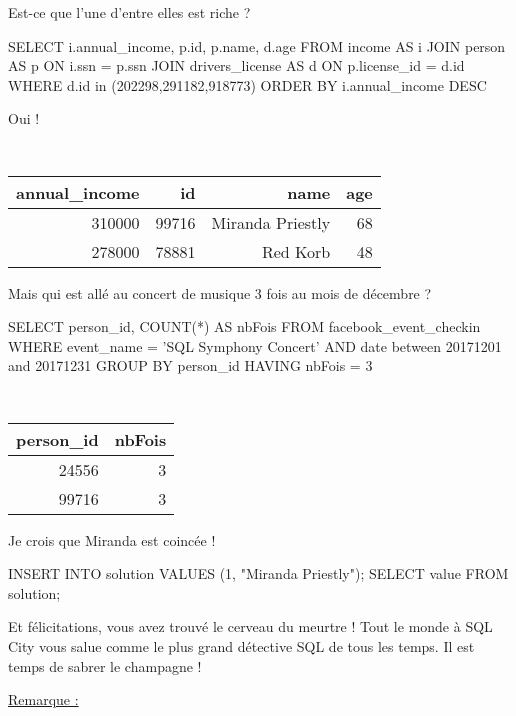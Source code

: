 \documentclass[10pt]{article}
\begin{document}
Est-ce que l'une d'entre elles est riche ?
\begin{sql}
SELECT i.annual_income, p.id, p.name, d.age FROM income AS i
JOIN person AS p 
ON i.ssn = p.ssn
JOIN drivers_license AS d
ON p.license_id = d.id
WHERE d.id in (202298,291182,918773)
ORDER BY i.annual_income DESC
\end{sql}
Oui !

\begin{table}[!htp]
\centering
{\tt
\begin{tabular}{rrrr}
annual\_income	&id&	name&	age \\ \hline
310000	&99716&	Miranda Priestly	&68\\
278000	&78881	&Red Korb&	48\\
\end{tabular}
}
\end{table}

Mais qui est allé au concert de musique 3 fois au mois de décembre ?

\begin{sql}
SELECT person_id, COUNT(*) AS nbFois
FROM facebook_event_checkin
WHERE event_name = 'SQL Symphony Concert'
AND date between 20171201 and 20171231
GROUP BY person_id
HAVING nbFois = 3 
\end{sql}

\begin{table}[!htp]
\centering
{\tt
\begin{tabular}{rr}
person\_id& nbFois \\ \hline
24556& 3 \\
99716& 3 \\
\end{tabular}
}
\end{table}

Je crois que Miranda est coincée !
\begin{sql}
INSERT INTO solution VALUES (1, "Miranda Priestly");
SELECT value FROM solution;
\end{sql}
Et félicitations, vous avez trouvé le cerveau du meurtre ! Tout le monde à SQL City vous salue comme le plus grand détective SQL de tous les temps. Il est temps de sabrer le champagne !






\underline{Remarque :}
\end{document}
